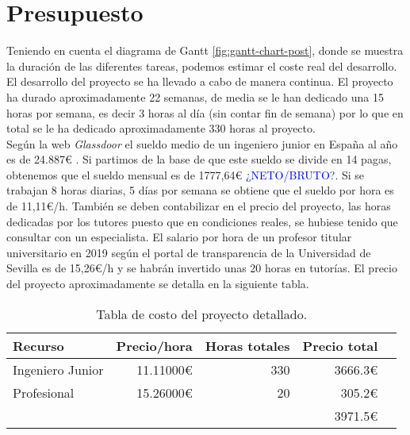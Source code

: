 

\cleardoublepage
\clearpage{}

\chapter[Presupuesto]{Presupuesto
}
Teniendo en cuenta el diagrama de Gantt \ref{fig:gantt-chart-post}, donde se muestra la duración de las diferentes tareas, podemos estimar el coste real del desarrollo. El desarrollo del proyecto se ha llevado a cabo de manera continua. El proyecto ha durado aproximadamente 22 semanas, de media se le han dedicado una 15 horas por semana, es decir 3 horas al día (sin contar fin de semana) por lo que en total se le ha dedicado aproximadamente 330 horas al proyecto.\\

Según la web \textit{Glassdoor} el sueldo medio de un ingeniero junior en España al año es de 24.887€ \cite{glassdoor}. Si partimos de la base de que este sueldo se divide en 14 pagas, obtenemos que el sueldo mensual es de 1777,64€ \textcolor{blue}{¿NETO/BRUTO?}. Si se trabajan 8 horas diarias, 5 días por semana se obtiene que el sueldo por hora es de 11,11€/h. También se deben contabilizar en el precio del proyecto, las horas dedicadas por los tutores puesto que en condiciones reales, se hubiese tenido que consultar con un especialista. El salario por hora de un profesor titular universitario en 2019 según el portal de transparencia de la Universidad de Sevilla \cite{sueldo-US} es de 15,26€/h y se habrán invertido unas 20 horas en tutorías. El precio del proyecto aproximadamente se detalla en la siguiente tabla.


\begin{table}[H]\centering
\scriptsize
\begin{tabular}{lrrrr}\toprule
Recurso &Precio/hora &Horas totales &Precio total \\\midrule
Ingeniero Junior &11.11000€ &330 &3666.3€ \\
Profesional &15.26000€ &20 &305.2€ \\
& & &3971.5€\\
\bottomrule
\end{tabular}
\caption{Tabla de costo del proyecto detallado.}
\end{table}



